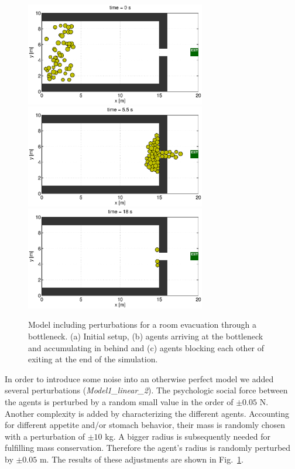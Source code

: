 \documentclass[11pt]{article}
\begin{document}
\begin{figure}
	\begin{center}
	\includegraphics[width=0.7\textwidth]
	{figures/Model1_direct_2b_000000.eps}
	\qquad
	\includegraphics[width=0.7\textwidth]
	{figures/Model1_direct_2b_000550.eps}
	\qquad
	\includegraphics[width=0.7\textwidth]
	{figures/Model1_direct_2b_001800.eps}
	\caption{Model including perturbations for a room evacuation through a bottleneck. (a) Initial setup, (b) agents arriving at the bottleneck and accumulating in behind and (c) agents blocking each other of exiting at the end of the simulation.}
	\label{fig:simple2}
	\end{center}
\end{figure}

In order to introduce some noise into an otherwise perfect model we added several perturbations ({\it Model1\_linear\_2}). The psychologic social force between the agents is perturbed by a random small value in the order of $\pm 0.05$ N. Another complexity is added by characterizing the different agents. Accounting for different appetite and/or stomach behavior, their mass is randomly chosen with a perturbation of $\pm 10$ kg. A bigger radius is subsequently needed for fulfilling mass conservation. Therefore the agent's radius is randomly perturbed by $\pm 0.05$ m. The results of these adjustments are shown in Fig.~\ref{fig:simple2}.
\end{document}
